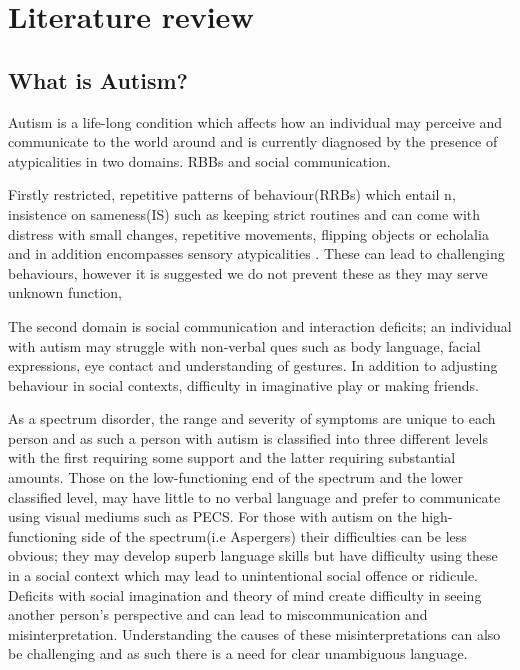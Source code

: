 \documentclass[11pt]{report}
\begin{document}
\chapter{Literature review}

\section{What is Autism?}

Autism is a life-long condition which affects how an individual may perceive and communicate to the world around\cite{nas} and is currently diagnosed by the presence of atypicalities in two domains. RBBs and social communication.

 Firstly restricted, repetitive patterns of behaviour(RRBs) which entail n, insistence on sameness(IS) such as keeping strict routines and can come with distress with small changes, repetitive movements, flipping objects or echolalia and in addition encompasses sensory atypicalities \cite{dsm52}. These can lead to challenging behaviours, however it is suggested we do not prevent these as they may serve unknown function,
 
 The second domain is social communication and interaction deficits; an individual with autism may struggle with non-verbal ques such as body language, facial expressions, eye contact and understanding of gestures. In addition to adjusting behaviour in social contexts, difficulty in imaginative play or making friends.  

As a spectrum disorder, the range and severity of symptoms are unique to each person and as such a person with autism is classified into three different levels with the first requiring some support and the latter requiring substantial amounts\cite{dsm52}. Those on the low-functioning end of the spectrum and the lower classified level, may have little to no verbal language and prefer to communicate using visual mediums such as PECS. For those with autism on the high-functioning side of the spectrum(i.e Aspergers) their difficulties can be less obvious; they may develop superb language skills but have difficulty using these in a social context which may lead to unintentional social offence or ridicule. Deficits with social imagination and theory of mind create difficulty in seeing another person's perspective and can lead to miscommunication and misinterpretation. Understanding the causes of these misinterpretations can also be challenging and as such there is a need for clear unambiguous language.  
\end{document}
